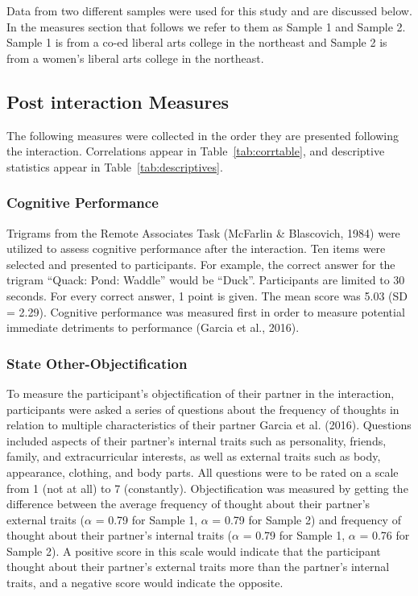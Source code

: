 \documentclass[man]{apa6}
\begin{document}
Data from two different samples were used for this study and are
discussed below. In the measures section that follows we refer to them
as Sample 1 and Sample 2. Sample 1 is from a co-ed liberal arts college
in the northeast and Sample 2 is from a women's liberal arts college in
the northeast.

\subsection{Post interaction Measures}\label{post-interaction-measures}

The following measures were collected in the order they are presented
following the interaction. Correlations appear in
Table~\ref{tab:corrtable}, and descriptive statistics appear in
Table~\ref{tab:descriptives}.

\subsubsection{Cognitive Performance}\label{cognitive-performance}

Trigrams from the Remote Associates Task (McFarlin \& Blascovich, 1984)
were utilized to assess cognitive performance after the interaction. Ten
items were selected and presented to participants. For example, the
correct answer for the trigram \enquote{Quack: Pond: Waddle} would be
\enquote{Duck}. Participants are limited to 30 seconds. For every
correct answer, 1 point is given. The mean score was 5.03 (SD = 2.29).
Cognitive performance was measured first in order to measure potential
immediate detriments to performance (Garcia et al., 2016).

\subsubsection{State
Other-Objectification}\label{state-other-objectification}

To measure the participant's objectification of their partner in the
interaction, participants were asked a series of questions about the
frequency of thoughts in relation to multiple characteristics of their
partner Garcia et al. (2016). Questions included aspects of their
partner's internal traits such as personality, friends, family, and
extracurricular interests, as well as external traits such as body,
appearance, clothing, and body parts. All questions were to be rated on
a scale from 1 (not at all) to 7 (constantly). Objectification was
measured by getting the difference between the average frequency of
thought about their partner's external traits (\(\alpha\) = 0.79 for
Sample 1, \(\alpha\) = 0.79 for Sample 2) and frequency of thought about
their partner's internal traits (\(\alpha\) = 0.79 for Sample 1,
\(\alpha\) = 0.76 for Sample 2). A positive score in this scale would
indicate that the participant thought about their partner's external
traits more than the partner's internal traits, and a negative score
would indicate the opposite.
\end{document}

